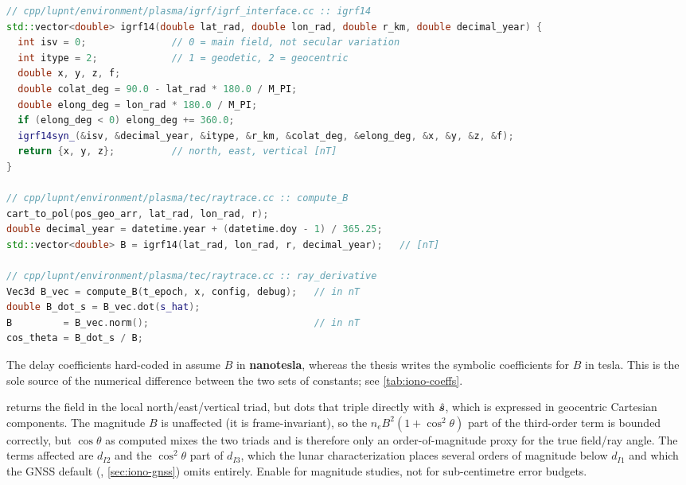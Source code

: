 \begin{lstlisting}[language=cpp, caption={IGRF-14 evaluation and the ray/field
angle.  Sources: \texttt{cpp/lupnt/environment/plasma/igrf/igrf\_interface.cc} and
\texttt{cpp/lupnt/environment/plasma/tec/raytrace.cc} ::
\code{compute\_B}.}, label={lst:iono-igrf}]
// cpp/lupnt/environment/plasma/igrf/igrf_interface.cc :: igrf14
std::vector<double> igrf14(double lat_rad, double lon_rad, double r_km, double decimal_year) {
  int isv = 0;               // 0 = main field, not secular variation
  int itype = 2;             // 1 = geodetic, 2 = geocentric
  double x, y, z, f;
  double colat_deg = 90.0 - lat_rad * 180.0 / M_PI;
  double elong_deg = lon_rad * 180.0 / M_PI;
  if (elong_deg < 0) elong_deg += 360.0;
  igrf14syn_(&isv, &decimal_year, &itype, &r_km, &colat_deg, &elong_deg, &x, &y, &z, &f);
  return {x, y, z};          // north, east, vertical [nT]
}

// cpp/lupnt/environment/plasma/tec/raytrace.cc :: compute_B
cart_to_pol(pos_geo_arr, lat_rad, lon_rad, r);
double decimal_year = datetime.year + (datetime.doy - 1) / 365.25;
std::vector<double> B = igrf14(lat_rad, lon_rad, r, decimal_year);   // [nT]

// cpp/lupnt/environment/plasma/tec/raytrace.cc :: ray_derivative
Vec3d B_vec = compute_B(t_epoch, x, config, debug);   // in nT
double B_dot_s = B_vec.dot(s_hat);
B         = B_vec.norm();                             // in nT
cos_theta = B_dot_s / B;
\end{lstlisting}

\begin{lupntnote}
The delay coefficients hard-coded in  assume $B$ in
\textbf{nanotesla}, whereas the thesis writes the symbolic coefficients for $B$
in tesla.  This is the sole source of the numerical difference between the two
sets of constants; see \cref{tab:iono-coeffs}.
\end{lupntnote}

\begin{lupntwarning}
 returns the field in the local north/east/vertical triad, but
 dots that triple directly with $\hat{\bm{s}}$, which is
expressed in geocentric Cartesian components.  The magnitude $B$ is unaffected
(it is frame-invariant), so the $n_e B^2(1+\cos^2\theta)$ part of the third-order
term is bounded correctly, but $\cos\theta$ as computed mixes the two triads and
is therefore only an order-of-magnitude proxy for the true field/ray angle.  The
terms affected are $d_{I2}$ and the $\cos^2\theta$ part of $d_{I3}$, which the
lunar characterization places several orders of magnitude below $d_{I1}$ and
which the GNSS default (, \cref{sec:iono-gnss}) omits entirely.
Enable  for magnitude studies, not for
sub-centimetre error budgets.
\end{lupntwarning}

